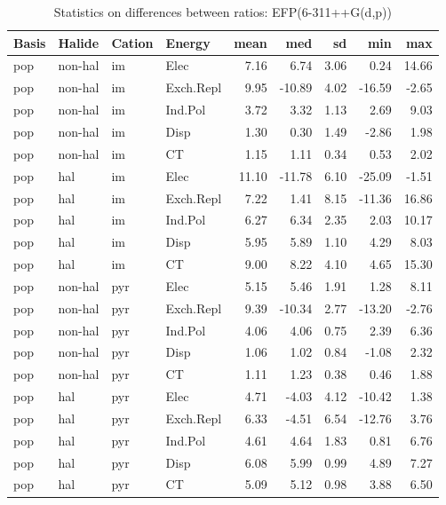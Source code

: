 \documentclass[a4paper]{article}
\begin{document}
\begin{table}[ht]
\centering
\begin{tabular}{llllrrrrr}
  \hline
Basis & Halide & Cation & Energy & mean & med & sd & min & max \\ 
  \hline
pop & non-hal & im & Elec & 7.16 & 6.74 & 3.06 & 0.24 & 14.66 \\ 
  pop & non-hal & im & Exch.Repl & 9.95 & -10.89 & 4.02 & -16.59 & -2.65 \\ 
  pop & non-hal & im & Ind.Pol & 3.72 & 3.32 & 1.13 & 2.69 & 9.03 \\ 
  pop & non-hal & im & Disp & 1.30 & 0.30 & 1.49 & -2.86 & 1.98 \\ 
  pop & non-hal & im & CT & 1.15 & 1.11 & 0.34 & 0.53 & 2.02 \\ 
  pop & hal & im & Elec & 11.10 & -11.78 & 6.10 & -25.09 & -1.51 \\ 
  pop & hal & im & Exch.Repl & 7.22 & 1.41 & 8.15 & -11.36 & 16.86 \\ 
  pop & hal & im & Ind.Pol & 6.27 & 6.34 & 2.35 & 2.03 & 10.17 \\ 
  pop & hal & im & Disp & 5.95 & 5.89 & 1.10 & 4.29 & 8.03 \\ 
  pop & hal & im & CT & 9.00 & 8.22 & 4.10 & 4.65 & 15.30 \\ 
  pop & non-hal & pyr & Elec & 5.15 & 5.46 & 1.91 & 1.28 & 8.11 \\ 
  pop & non-hal & pyr & Exch.Repl & 9.39 & -10.34 & 2.77 & -13.20 & -2.76 \\ 
  pop & non-hal & pyr & Ind.Pol & 4.06 & 4.06 & 0.75 & 2.39 & 6.36 \\ 
  pop & non-hal & pyr & Disp & 1.06 & 1.02 & 0.84 & -1.08 & 2.32 \\ 
  pop & non-hal & pyr & CT & 1.11 & 1.23 & 0.38 & 0.46 & 1.88 \\ 
  pop & hal & pyr & Elec & 4.71 & -4.03 & 4.12 & -10.42 & 1.38 \\ 
  pop & hal & pyr & Exch.Repl & 6.33 & -4.51 & 6.54 & -12.76 & 3.76 \\ 
  pop & hal & pyr & Ind.Pol & 4.61 & 4.64 & 1.83 & 0.81 & 6.76 \\ 
  pop & hal & pyr & Disp & 6.08 & 5.99 & 0.99 & 4.89 & 7.27 \\ 
  pop & hal & pyr & CT & 5.09 & 5.12 & 0.98 & 3.88 & 6.50 \\ 
   \hline
\end{tabular}
\caption{Statistics on differences between ratios: EFP(6-311++G(d,p))}
\end{table}
\end{document}
